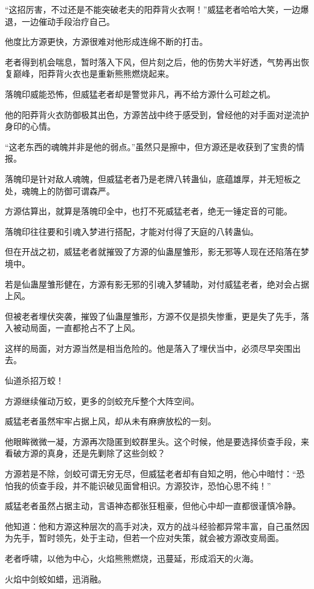 \begin{this_body}
“这招厉害，不过还是不能突破老夫的阳莽背火衣啊！”威猛老者哈哈大笑，一边爆退，一边催动手段治疗自己。

他度比方源更快，方源很难对他形成连绵不断的打击。

老者得到机会喘息，暂时落入下风，但片刻之后，他的伤势大半好透，气势再出恢复巅峰，阳莽背火衣也是重新熊熊燃烧起来。

落魄印威能恐怖，但威猛老者却是警觉非凡，再不给方源什么可趁之机。

他的阳莽背火衣防御极其出色，方源苦战中终于感受到，曾经他的对手面对逆流护身印的心情。

“这老东西的魂魄并非是他的弱点。”虽然只是擦中，但方源还是收获到了宝贵的情报。

落魄印是针对敌人魂魄，但威猛老者乃是老牌八转蛊仙，底蕴雄厚，并无短板之处，魂魄上的防御可谓森严。

方源估算出，就算是落魄印全中，也打不死威猛老者，绝无一锤定音的可能。

落魄印往往要和引魂入梦进行搭配，才能对付得了天庭的八转蛊仙。

但在开战之初，威猛老者就摧毁了方源的仙蛊屋雏形，影无邪等人现在还陷落在梦境中。

若是仙蛊屋雏形健在，方源有影无邪的引魂入梦辅助，对付威猛老者，绝对会占据上风。

但被老者埋伏突袭，摧毁了仙蛊屋雏形，方源不仅是损失惨重，更是失了先手，落入被动局面，一直都抢占不了上风。

这样的局面，对方源当然是相当危险的。他是落入了埋伏当中，必须尽早突围出去。

仙道杀招万蛟！

方源继续催动万蛟，更多的剑蛟充斥整个大阵空间。

威猛老者虽然牢牢占据上风，却从未有麻痹放松的一刻。

他眼眸微微一凝，方源再次隐匿到蛟群里头。这个时候，他是要选择侦查手段，来看破方源的真身，还是先剿除了这些剑蛟？

方源若是不除，剑蛟可谓无穷无尽，但威猛老者却有自知之明，他心中暗忖：“恐怕我的侦查手段，并不能识破见面曾相识。方源狡诈，恐怕心思不纯！”

威猛老者虽然占据主动，言语神态都张狂粗豪，但他心中却一直都很谨慎冷静。

他知道：他和方源这种层次的高手对决，双方的战斗经验都异常丰富，自己虽然因为先手，暂时领先，处于主动，但若一个应对失策，就会被方源改变局面。

老者呼啸，以他为中心，火焰熊熊燃烧，迅蔓延，形成滔天的火海。

火焰中剑蛟如蜡，迅消融。


\end{this_body}
